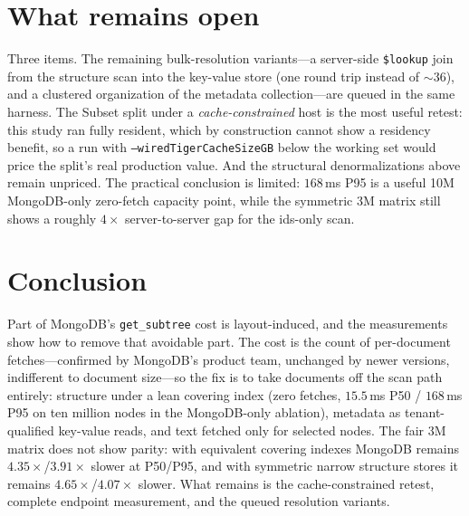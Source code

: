 \documentclass[11pt]{article}
\newcommand{\code}[1]{\texttt{#1}}
\begin{document}
\section{What remains open}\label{sec:open}

Three items. The remaining bulk-resolution variants---a server-side
\code{\$lookup} join from the structure scan into the key-value store (one
round trip instead of ${\sim}36$), and a clustered organization of the metadata
collection---are queued in the same harness. The Subset split under a
\emph{cache-constrained} host is the most useful retest: this study ran fully
resident, which by construction cannot show a residency benefit, so a run with
\code{--wiredTigerCacheSizeGB} below the working set would price the split's
real production value. And the structural denormalizations above remain
unpriced. The practical conclusion is limited: $168$\,ms P95 is a useful 10M
MongoDB-only zero-fetch capacity point, while the symmetric 3M matrix still
shows a roughly $4{\times}$ server-to-server gap for the ids-only scan.

\section{Conclusion}

Part of MongoDB's \code{get\_subtree} cost is layout-induced, and the
measurements show how to remove that avoidable part. The cost is the count of per-document fetches---confirmed by
MongoDB's product team, unchanged by newer versions, indifferent to document
size---so the fix is to take documents off the scan path entirely: structure
under a lean covering index (zero fetches, $15.5$\,ms P50 / $168$\,ms P95 on
ten million nodes in the MongoDB-only ablation), metadata as tenant-qualified
key-value reads, and text fetched only for selected nodes. The fair 3M matrix
does not show parity: with equivalent covering indexes MongoDB remains
$4.35{\times}$/$3.91{\times}$ slower at P50/P95, and with symmetric narrow
structure stores it remains $4.65{\times}$/$4.07{\times}$ slower. What remains
is the cache-constrained retest, complete endpoint measurement, and the queued
resolution variants.
\end{document}
